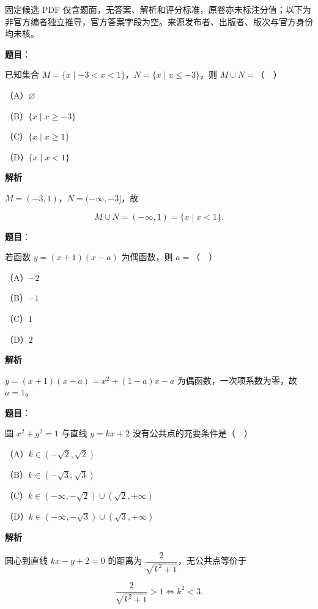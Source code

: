

\begin{gktip}
固定候选 PDF 仅含题面，无答案、解析和评分标准，原卷亦未标注分值；以下为非官方编者独立推导，官方答案字段为空。来源发布者、出版者、版次与官方身份均未核。
\end{gktip}

\begin{answer}

\textbf{题目}：

已知集合 $M=\{x\mid -3<x<1\}$，$N=\{x\mid x\leqslant-3\}$，则 $M\cup N=$（　）

（A）$\varnothing$

（B）$\{x\mid x\geqslant-3\}$

（C）$\{x\mid x\geqslant1\}$

（D）$\{x\mid x<1\}$

\textbf{解析}

$M=(-3,1)$，$N=(-\infty,-3]$，故

\nopagebreak[4]
\[M\cup N=(-\infty,1)=\{x\mid x<1\}.\]


\end{answer}
\begin{answer}

\textbf{题目}：

若函数 $y=(x+1)(x-a)$ 为偶函数，则 $a=$（　）

（A）$-2$

（B）$-1$

（C）$1$

（D）$2$

\textbf{解析}

$y=(x+1)(x-a)=x^2+(1-a)x-a$ 为偶函数，一次项系数为零，故 $a=1$。


\end{answer}
\begin{answer}

\textbf{题目}：

圆 $x^2+y^2=1$ 与直线 $y=kx+2$ 没有公共点的充要条件是（　）

（A）$k\in(-\sqrt2,\sqrt2)$

（B）$k\in(-\sqrt3,\sqrt3)$

（C）$k\in(-\infty,-\sqrt2)\cup(\sqrt2,+\infty)$

（D）$k\in(-\infty,-\sqrt3)\cup(\sqrt3,+\infty)$

\textbf{解析}

圆心到直线 $kx-y+2=0$ 的距离为 $\dfrac2{\sqrt{k^2+1}}$，无公共点等价于

\nopagebreak[4]
\[\frac2{\sqrt{k^2+1}}>1\iff k^2<3.\]


\end{answer}
